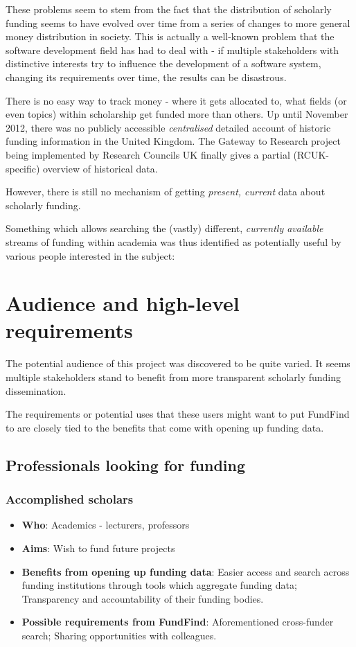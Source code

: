 These problems seem to stem from the fact that the distribution of scholarly funding seems to have evolved over time from a series of changes to more general money distribution in society. This is actually a well-known problem that the software development field has had to deal with - if multiple stakeholders with distinctive interests try to influence the development of a software system, changing its requirements over time, the results can be disastrous.

There is no easy way to track money - where it gets allocated to, what fields (or even topics) within scholarship get funded more than others. Up until November 2012, there was no publicly accessible \emph{centralised} detailed account of historic funding information in the United Kingdom. The Gateway to Research project being implemented by Research Councils UK finally gives a partial (RCUK-specific) overview of historical data.

However, there is still no mechanism of getting \emph{present, current} data about scholarly funding.

Something which allows searching the (vastly) different, \emph{currently available} streams of funding within academia was thus identified as potentially useful by various people interested in the subject:

\section{Audience and high-level requirements}
\label{audience}
The potential audience of this project was discovered to be quite varied. It seems multiple stakeholders stand to benefit from more transparent scholarly funding dissemination.

The requirements or potential uses that these users might want to put FundFind to are closely tied to the benefits that come with opening up funding data.

\subsection{Professionals looking for funding}

\subsubsection{Accomplished scholars}
\begin{itemize}
 \item \textbf{Who}: Academics - lecturers, professors
 \item \textbf{Aims}: Wish to fund future projects
 \item \textbf{Benefits from opening up funding data}: Easier access and search across funding institutions through tools which aggregate funding data; Transparency and accountability of their funding bodies.
 \item \textbf{Possible requirements from FundFind}: Aforementioned cross-funder search; Sharing opportunities with colleagues.
\end{itemize}


